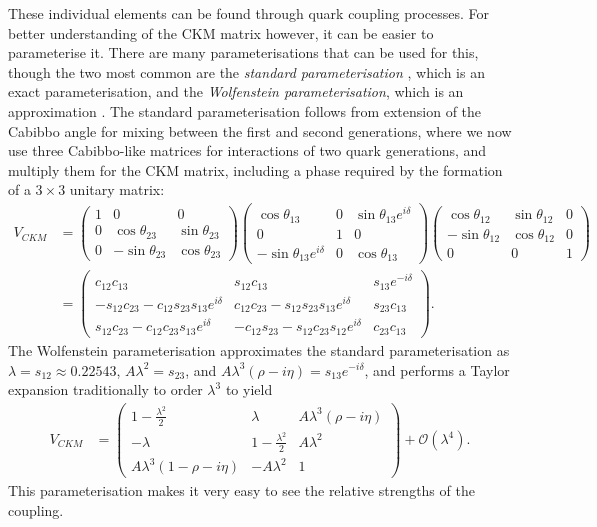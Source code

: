 \documentclass[a4paper,12pt]{article}
\begin{document}
These individual elements can be found through quark coupling processes. 
For better understanding of the CKM matrix however, it can be easier to parameterise it. 
There are many parameterisations that can be used for this, though the two most common are the \emph{standard parameterisation} \cite{pdg}, which is an exact parameterisation, and the \emph{Wolfenstein parameterisation}, which is an approximation \cite{wolf}.
The standard parameterisation follows from extension of the Cabibbo angle for mixing between the first and second generations, where we now use three Cabibbo-like matrices for interactions of two quark generations, and multiply them for the CKM matrix, including a phase required by the formation of a $3\times3$ unitary matrix:
\begin{equation}
    \label{eq:standpar}
    \begin{split}
        V_{CKM} &= \begin{pmatrix}1&0&0\\0&\cos\theta_{23}&\sin\theta_{23}\\0&-\sin\theta_{23}&\cos\theta_{23}\end{pmatrix}\begin{pmatrix}\cos\theta_{13}&0&\sin\theta_{13}e^{i\delta}\\0&1&0\\-\sin\theta_{13}e^{i\delta}&0&\cos\theta_{13}\end{pmatrix}\begin{pmatrix}\cos\theta_{12}&\sin\theta_{12}&0\\-\sin\theta_{12}&\cos\theta_{12}&0\\0&0&1\end{pmatrix}\\
                &= \begin{pmatrix}c_{12}c_{13} & s_{12}c_{13} & s_{13}e^{-i\delta} \\ -s_{12}c_{23}-c_{12}s_{23}s_{13}e^{i\delta} & c_{12}c_{23}-s_{12}s_{23}s_{13}e^{i\delta} & s_{23}c_{13} \\ s_{12}c_{23}-c_{12}c_{23}s_{13}e^{i\delta} & -c_{12}s_{23}-s_{12}c_{23}s_{12}e^{i\delta} & c_{23}c_{13}\end{pmatrix}.
    \end{split}
\end{equation}
The Wolfenstein parameterisation approximates the standard parameterisation as $\lambda=s_{12}\approx0.22543$, $A\lambda^2=s_{23}$, and $A\lambda^3(\rho-i\eta)=s_{13}e^{-i\delta}$, and performs a Taylor expansion traditionally to order $\lambda^3$ to yield
\begin{align}
    \label{eq:wolfie}
    V_{CKM} &= \begin{pmatrix} 1-\frac{\lambda^2}{2} & \lambda & A\lambda^3(\rho-i\eta) \\ -\lambda & 1-\frac{\lambda^2}{2} & A\lambda^2 \\ A\lambda^3(1-\rho-i\eta) & -A\lambda^2 & 1\end{pmatrix} + \mathcal{O}(\lambda^4).
\end{align}
This parameterisation makes it very easy to see the relative strengths of the coupling. 
\end{document}
